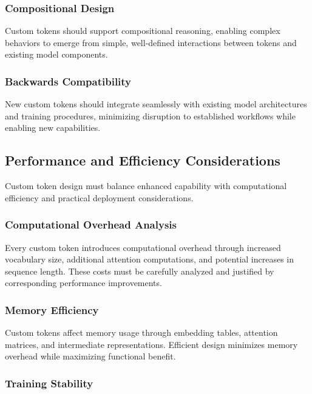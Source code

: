 \subsubsection{Compositional Design}

Custom tokens should support compositional reasoning, enabling complex behaviors to emerge from simple, well-defined interactions between tokens and existing model components.

\subsubsection{Backwards Compatibility}

New custom tokens should integrate seamlessly with existing model architectures and training procedures, minimizing disruption to established workflows while enabling new capabilities.

\subsection{Performance and Efficiency Considerations}

Custom token design must balance enhanced capability with computational efficiency and practical deployment considerations.

\subsubsection{Computational Overhead Analysis}

Every custom token introduces computational overhead through increased vocabulary size, additional attention computations, and potential increases in sequence length. These costs must be carefully analyzed and justified by corresponding performance improvements.

\subsubsection{Memory Efficiency}

Custom tokens affect memory usage through embedding tables, attention matrices, and intermediate representations. Efficient design minimizes memory overhead while maximizing functional benefit.

\subsubsection{Training Stability}

